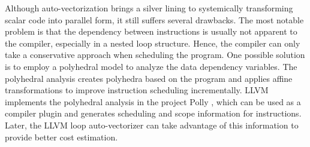 Although auto-vectorization brings a silver lining to systemically transforming scalar code into parallel form, it still suffers several drawbacks. The most notable problem is that the dependency between instructions is usually not apparent to the compiler, especially in a nested loop structure. Hence, the compiler can only take a conservative approach when scheduling the program. One possible solution is to employ a polyhedral model \cite{polyhedral} to analyze the data dependency variables. The polyhedral analysis creates polyhedra based on the program and applies affine transformations to improve instruction scheduling incrementally. LLVM implements the polyhedral analysis in the project Polly \cite{polly}, which can be used as a compiler plugin and generates scheduling and scope information for instructions. Later, the LLVM loop auto-vectorizer can take advantage of this information to provide better cost estimation. 